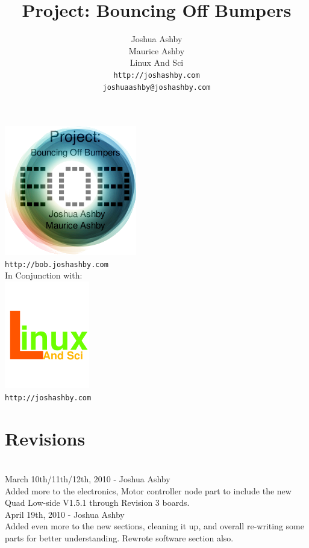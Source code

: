 \documentclass{article}
\begin{document}
\author{Joshua Ashby\\
        Maurice Ashby\\
        Linux And Sci\\
        \texttt{http://joshashby.com}\\
	\texttt{joshuaashby@joshashby.com}
}
\title{Project: Bouncing Off Bumpers}

  \begin{center}
\includegraphics{boblogo}\\
\texttt{http://bob.joshashby.com}\\

In Conjunction with:\\
\includegraphics{linuxandscilogo}\\
\texttt{http://joshashby.com}\\
  \end{center}

\maketitle

\newpage
\tableofcontents
\listoffigures
\renewcommand{\lstlistlistingname}{List of Listings}
\lstlistoflistings

\section{Revisions}\\
March 10th/11th/12th, 2010 - Joshua Ashby\\
Added more to the electronics, Motor controller node part to include the new Quad Low-side V1.5.1 through Revision 3 boards.\\
April 19th, 2010 - Joshua Ashby\\
Added even more to the new sections, cleaning it up, and overall re-writing some parts for better understanding. Rewrote software section also.\\
\end{document}
